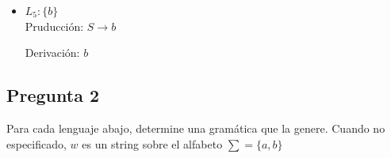 \documentclass{article}
\begin{document}
\begin{enumerate}
\begin{itemize}
                    \item $ L_5 : \{b\}$ \\
                        Pruducción: 
                        $ S \to b $
                        
                        Derivación:
                        $ b $ 
                        
               \end{itemize}
               
        \end{enumerate}
    
    
    
    
    \subsection{Pregunta 2}
	Para cada lenguaje abajo, determine una gramática que la genere. Cuando no especificado, $w$ es un string sobre el alfabeto $\sum = \{a, b\}$ \cite{jflap}
	
\end{document}
